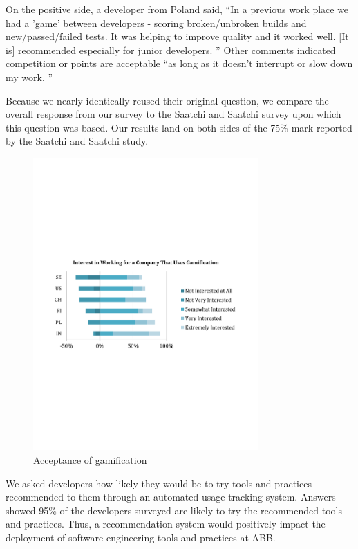\documentclass{sig-alternate}
\begin{document}
On the positive side, a developer from Poland said, ``In a previous work place we had a 'game' between developers - scoring broken/unbroken builds and new/passed/failed tests. It was helping to improve quality and it worked well. [It is] recommended especially for junior developers. ''  Other comments indicated competition or points are acceptable ``as long as it doesn't interrupt or slow down my work. ''

Because we nearly identically reused their original question, we compare the overall response from our survey to the Saatchi and Saatchi survey\cite{wbsnipes:SaatchiGameification} upon which this question was based.  Our results land on both sides of the 75\% mark reported by the Saatchi and Saatchi study.  

\begin{figure}
	\includegraphics[width=3.4in]{gamificationquestion.pdf}
	\caption{Acceptance of gamification}
	\label{fig:gamification}
\end{figure}

We asked developers how likely they would be to try tools and practices recommended to them through an automated usage tracking system.  Answers showed 95\% of the developers surveyed are likely to try the recommended tools and practices.  Thus, a recommendation system would positively impact the deployment of software engineering tools and practices at ABB.
\end{document}
